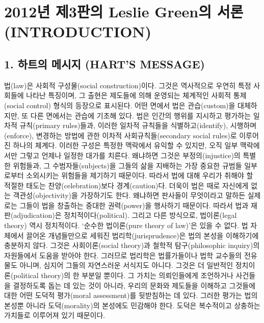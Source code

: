 \section{2012년 제3판의 Leslie Green의 서론
(INTRODUCTION)}\label{uxb144-uxc81c3uxd310uxc758-leslie-greenuxc758-uxc11cuxb860-introduction}

\subsection{1. 하트의 메시지 (HART'S
MESSAGE)}\label{uxd558uxd2b8uxc758-uxba54uxc2dcuxc9c0-harts-message}

법(law)은 사회적 구성물(social construction)이다. 그것은 역사적으로
우연히 특정 사회들에 나타난 특징이며, 그 출현은 제도들에 의해 운영되는
체계적인 사회적 통제(social control) 형식의 등장으로 표시된다. 어떤
면에서 법은 관습(custom)을 대체하지만, 또 다른 면에서는 관습에 기초해
있다. 법은 인간의 행위를 지시하고 평가하는 일차적 규칙(primary
rules)들과, 이러한 일차적 규칙들을 식별하고(identify),
시행하며(enforce), 변경하는 방법에 관한 이차적 사회규칙들(secondary
social rules)로 이루어진 하나의 체계다. 이러한 구성은 특정한 맥락에서
유익할 수 있지만, 오직 일부 맥락에서만 그렇고 언제나 일정한 대가를
치른다. 왜냐하면 그것은 부정의(injustice)의 특별한 위험들과, 그
수범자들(subjects)을 그들의 삶을 지배하는 가장 중요한 규범들 일부로부터
소외시키는 위험들을 제기하기 때문이다. 따라서 법에 대해 우리가 취해야 할
적절한 태도는 찬양(celebration)보다 경계(caution)다. 더욱이 법은 때로
자신에게 없는 객관성(objectivity)을 가장하기도 한다. 왜냐하면 판사들이
무엇이라고 말하든 실제로는 그들이 법을 창출하는 중대한 권력(power)을
행사하기 때문이다. 따라서 법과 재판(adjudication)은
정치적이다(political). 그리고 다른 방식으로, 법이론(legal theory) 역시
정치적이다. ‘순수한 법이론(pure theory of law)’은 있을 수 없다. 법
자체에서 끌어온 개념들만으로 세워진 법리학(jurisprudence)은 법의 본성을
이해하기에 충분하지 않다. 그것은 사회이론(social theory)과 철학적
탐구(philosophic inquiry)의 자원들에서 도움을 받아야 한다. 그러므로
법리학은 법률가들이나 법학 교수들의 전유물도 아니며, 심지어 그들의
자연스러운 서식지도 아니다. 그것은 더 일반적인 정치이론(political
theory)의 한 부분일 뿐이다. 그 가치는 의뢰인들에게 조언하거나 사건들을
결정하도록 돕는 데 있는 것이 아니라, 우리의 문화와 제도들을 이해하고
그것들에 대한 어떤 도덕적 평가(moral assessment)를 뒷받침하는 데 있다.
그러한 평가는 법의 본성뿐 아니라 도덕(morality)의 본성에도 민감해야
한다. 도덕은 복수적이고 상충하는 가치들로 이루어져 있기 때문이다.

